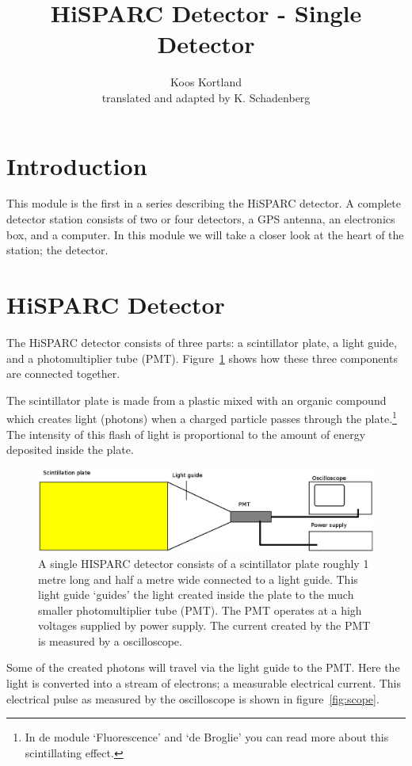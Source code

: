 \documentclass[12pt,a4paper]{article}
\author{Koos Kortland \\ translated and adapted by K. Schadenberg}
\date{}
\title{HiSPARC Detector - Single Detector}
\numberwithin{equation}{section}
\numberwithin{figure}{section}
\numberwithin{table}{section}
\begin{document}
\maketitle

\section{Introduction}
This module is the first in a series describing the HiSPARC detector. A complete detector station consists of two or four detectors, a GPS antenna, an electronics box, and a computer. In this module we will take a closer look at the heart of the station; the detector. 

\section{HiSPARC Detector}
The HiSPARC detector consists of three parts: a scintillator plate, a light guide, and a photomultiplier tube (PMT). Figure~\ref{fig:detector} shows how these three components are connected together.

The scintillator plate is made from a plastic mixed with an organic compound which creates light (photons) when a charged particle passes through the plate.\footnote{In de module `Fluorescence' and `de Broglie' you can read more about this scintillating effect.} The intensity of this flash of light is proportional to the amount of energy deposited inside the plate.

\begin{figure}\begin{center}
\includegraphics[scale=0.38]{detector.eps}%
\caption{A single HISPARC detector consists of a scintillator plate roughly 1 metre long and half a metre wide connected to a light guide. This light guide `guides' the light created inside the plate to the much smaller photomultiplier tube (PMT). The PMT operates at a high voltages supplied by power supply. The current created by the PMT is measured by a oscilloscope.}\label{fig:detector}
\end{center}\end{figure}

Some of the created photons will travel via the light guide to the PMT. Here the light is converted into a stream of electrons; a measurable electrical current. This electrical pulse as measured by the oscilloscope is shown in figure~\ref{fig:scope}.
\end{document}
